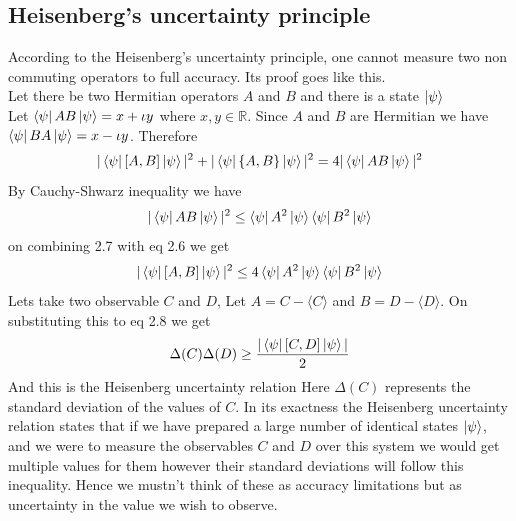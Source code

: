 \documentclass{report}
\begin{document}
\subsection{Heisenberg's uncertainty principle}
According to the Heisenberg's uncertainty principle, one cannot measure two non commuting operators to full accuracy. Its proof goes like this.\\
Let there be two Hermitian operators $A$ and $B$ and there is a state $\ket{\psi}$\\
Let $\bra{\psi}AB\ket{\psi} = x + {\iota}y$ where $x,y \in \mathbb{R}$. Since $A$ and $B$ are Hermitian we have $\bra{\psi}BA\ket{\psi} = x - {\iota}y$.
Therefore\\
\begin{equation}|\bra{\psi}[A,B]\ket{\psi}|^2 + |\bra{\psi}\{A,B\}\ket{\psi}|^2 = 4|\bra{\psi}AB\ket{\psi}|^2\end{equation}
By Cauchy-Shwarz inequality we have
\begin{equation}|\bra{\psi}AB\ket{\psi}|^2 \leq \bra{\psi}A^2\ket{\psi}\bra{\psi}B^2\ket{\psi}\end{equation}
on combining 2.7 with eq 2.6 we get
\begin{equation}|\bra{\psi}[A,B]\ket{\psi}|^2 \leq 4\bra{\psi}A^2\ket{\psi}\bra{\psi}B^2\ket{\psi}\end{equation}
Lets take two observable $C$ and $D$, Let $A = C - \langle{C}\rangle$ and $B = D - \langle{D}\rangle$. On substituting this to eq 2.8 we get
\begin{equation}\Delta(C)\Delta(D) \geq \dfrac{|\bra{\psi}[C,D]\ket{\psi}|}{2}\end{equation}
And this is the Heisenberg uncertainty relation
Here $\Delta(C)$ represents the standard deviation of the values of $C$. In its exactness the Heisenberg uncertainty relation states that if we have prepared a large number of identical states $\ket{\psi}$, and we were to measure the observables $C$ and $D$ over this system we would get multiple values for them however their standard deviations will follow this inequality. Hence we mustn't think of these as accuracy limitations but as uncertainty in the value we wish to observe.
\end{document}
